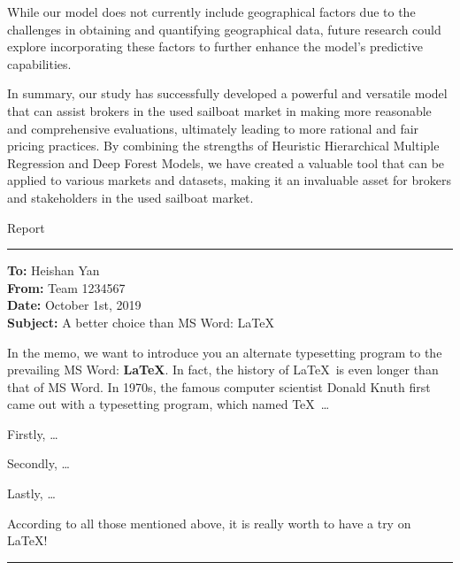 \documentclass[12pt]{article}  %
\begin{document}
While our model does not currently include geographical factors due to the challenges in obtaining and quantifying geographical data, future research could explore incorporating these factors to further enhance the model's predictive capabilities.

In summary, our study has successfully developed a powerful and versatile model that can assist brokers in the used sailboat market in making more reasonable and comprehensive evaluations, ultimately leading to more rational and fair pricing practices. By combining the strengths of Heuristic Hierarchical Multiple Regression and Deep Forest Models, we have created a valuable tool that can be applied to various markets and datasets, making it an invaluable asset for brokers and stakeholders in the used sailboat market.
\begin{letter}{Report}
\noindent\rule[0.25\baselineskip]{\textwidth}{2pt} 
\begin{flushleft}  %
\textbf{To:} Heishan Yan\\
\textbf{From:} Team 1234567\\
\textbf{Date:} October 1st, 2019\\
\textbf{Subject:} A better choice than MS Word: \LaTeX
\end{flushleft}

In the memo, we want to introduce you an alternate typesetting program to the prevailing MS Word: \textbf{\LaTeX}. In fact, the history of \LaTeX\ is even longer than that of MS Word. In 1970s, the famous computer scientist Donald Knuth first came out with a typesetting program, which named \TeX\ \ldots

Firstly, \ldots

Secondly, \ldots

Lastly, \ldots

According to all those mentioned above, it is really worth to have a try on \LaTeX! 

\noindent\rule[0.25\baselineskip]{\textwidth}{2pt} 
\end{letter}
\clearpage
\end{document}
